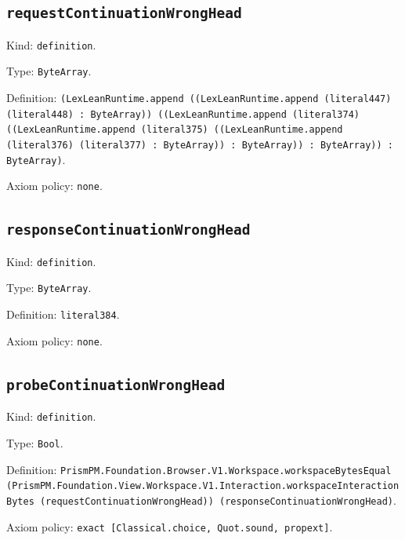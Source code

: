 \documentclass[11pt]{article}
\begin{document}
\subsection*{\texttt{requestContinuationWrongHead}}
\noindent Kind: \texttt{definition}.\par
\noindent Type: \texttt{ByteArray}.\par
\noindent Definition: \texttt{(LexLeanRuntime.append ((LexLeanRuntime.append (literal447) (literal448) : ByteArray)) ((LexLeanRuntime.append (literal374) ((LexLeanRuntime.append (literal375) ((LexLeanRuntime.append (literal376) (literal377) : ByteArray)) : ByteArray)) : ByteArray)) : ByteArray)}.\par
\noindent Axiom policy: \texttt{none}.\par
\subsection*{\texttt{responseContinuationWrongHead}}
\noindent Kind: \texttt{definition}.\par
\noindent Type: \texttt{ByteArray}.\par
\noindent Definition: \texttt{literal384}.\par
\noindent Axiom policy: \texttt{none}.\par
\subsection*{\texttt{probeContinuationWrongHead}}
\noindent Kind: \texttt{definition}.\par
\noindent Type: \texttt{Bool}.\par
\noindent Definition: \texttt{PrismPM.Foundation.Browser.V1.Workspace.workspaceBytesEqual (PrismPM.Foundation.View.Workspace.V1.Interaction.workspaceInteractionBytes (requestContinuationWrongHead)) (responseContinuationWrongHead)}.\par
\noindent Axiom policy: \texttt{exact [Classical.choice, Quot.sound, propext]}.\par
\end{document}
